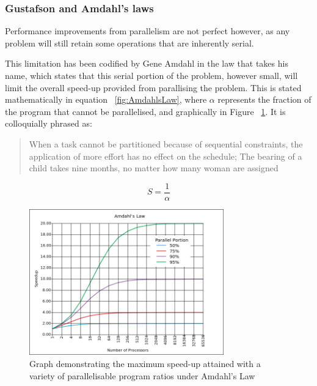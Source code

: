 \subsubsection{Gustafson and Amdahl's laws}
Performance improvements from parallelism are not perfect however, as any problem will still retain some operations that are inherently serial.

This limitation has been codified by Gene Amdahl in the law that takes his name\cite{Amd67}, which states that this serial portion of the problem, however small, will limit the overall speed-up provided from parallising the problem. This is stated mathematically in equation ~\eqref{fig:AmdahlsLaw}, where \(\alpha\) represents the fraction of the program that cannot be parallelised, and graphically in Figure ~\ref{fig:AmdahlFigure}. It is colloquially phrased as:

\begin{quotation}
When a task cannot be partitioned because of sequential constraints, the application of more effort has no effect on the schedule; The bearing of a child takes nine months, no matter how many woman are assigned
\end{quotation}

\begin{equation}
\label{fig:AmdahlsLaw}
S=\frac{1}{\alpha}
\end{equation}

\begin{figure}[h!]
  \centering
  \includegraphics[width=0.75\textwidth,keepaspectratio=true]{images/AmdahlsLaw.png}
  \caption{Graph demonstrating the maximum speed-up attained with a variety of parallelisable program ratios under Amdahl's Law}
  \label{fig:AmdahlFigure}
\end{figure}


